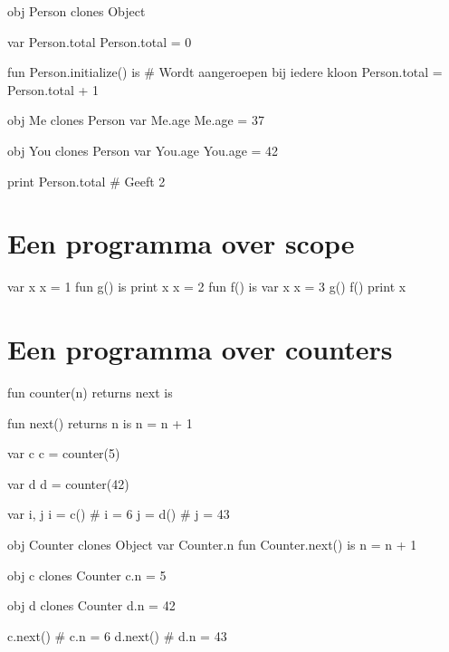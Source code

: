 \begin{program}
obj Person clones Object

var Person.total
Person.total = 0

fun Person.initialize() is   # Wordt aangeroepen bij iedere kloon
    Person.total = Person.total + 1

obj Me clones Person
var Me.age
Me.age = 37

obj You clones Person
var You.age
You.age = 42

print Person.total           # Geeft 2
\end{program}

\section{Een programma over scope}

\begin{program}
var x
x = 1
fun g() is
    print x
    x = 2
fun f() is
    var x
    x = 3
    g()
f()
print x
\end{program}

\section{Een programma over counters}

\begin{minipage}{0.5\textwidth}
\begin{program}
fun counter(n) returns next is

    fun next() returns n is
        n = n + 1

var c
c = counter(5)

var d
d = counter(42)

var i, j
i = c() # i = 6
j = d() # j = 43
\end{program}
\end{minipage}
\begin{minipage}{0.5\textwidth}
\begin{program}
obj Counter clones Object
var Counter.n
fun Counter.next() is
    n = n + 1

obj c clones Counter
c.n = 5

obj d clones Counter
d.n = 42


c.next() # c.n = 6
d.next() # d.n = 43
\end{program}
\end{minipage}

